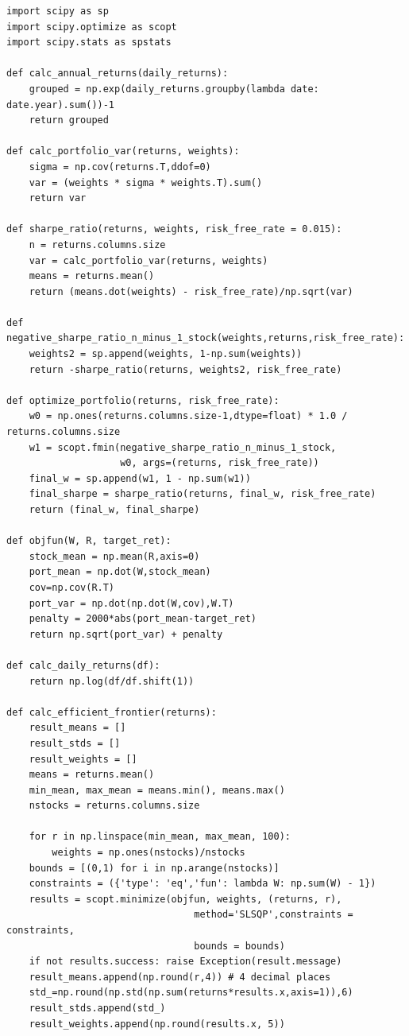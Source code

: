 \documentclass[12pt,fleqn]{article}\usepackage{../../common}
\begin{document}
\begin{verbatim}
import scipy as sp
import scipy.optimize as scopt
import scipy.stats as spstats

def calc_annual_returns(daily_returns):
    grouped = np.exp(daily_returns.groupby(lambda date: date.year).sum())-1
    return grouped

def calc_portfolio_var(returns, weights):
    sigma = np.cov(returns.T,ddof=0)
    var = (weights * sigma * weights.T).sum()
    return var

def sharpe_ratio(returns, weights, risk_free_rate = 0.015):
    n = returns.columns.size
    var = calc_portfolio_var(returns, weights)
    means = returns.mean()
    return (means.dot(weights) - risk_free_rate)/np.sqrt(var)

def negative_sharpe_ratio_n_minus_1_stock(weights,returns,risk_free_rate):
    weights2 = sp.append(weights, 1-np.sum(weights))
    return -sharpe_ratio(returns, weights2, risk_free_rate)

def optimize_portfolio(returns, risk_free_rate):
    w0 = np.ones(returns.columns.size-1,dtype=float) * 1.0 / returns.columns.size
    w1 = scopt.fmin(negative_sharpe_ratio_n_minus_1_stock,
                    w0, args=(returns, risk_free_rate))
    final_w = sp.append(w1, 1 - np.sum(w1))
    final_sharpe = sharpe_ratio(returns, final_w, risk_free_rate)
    return (final_w, final_sharpe)

def objfun(W, R, target_ret):
    stock_mean = np.mean(R,axis=0)
    port_mean = np.dot(W,stock_mean)
    cov=np.cov(R.T)
    port_var = np.dot(np.dot(W,cov),W.T)
    penalty = 2000*abs(port_mean-target_ret)
    return np.sqrt(port_var) + penalty

def calc_daily_returns(df):
    return np.log(df/df.shift(1))

def calc_efficient_frontier(returns):
    result_means = []
    result_stds = []
    result_weights = []
    means = returns.mean()
    min_mean, max_mean = means.min(), means.max()
    nstocks = returns.columns.size

    for r in np.linspace(min_mean, max_mean, 100):
    	weights = np.ones(nstocks)/nstocks
	bounds = [(0,1) for i in np.arange(nstocks)]
	constraints = ({'type': 'eq','fun': lambda W: np.sum(W) - 1})
	results = scopt.minimize(objfun, weights, (returns, r),
                                 method='SLSQP',constraints = constraints,
                                 bounds = bounds)
	if not results.success: raise Exception(result.message)
	result_means.append(np.round(r,4)) # 4 decimal places
	std_=np.round(np.std(np.sum(returns*results.x,axis=1)),6)
	result_stds.append(std_)
	result_weights.append(np.round(results.x, 5))
	

\end{verbatim}
\end{document}

